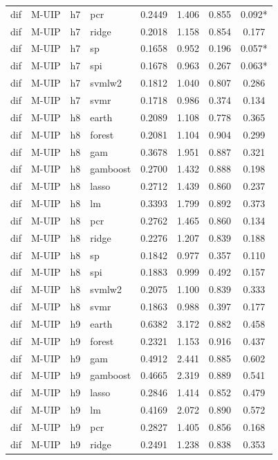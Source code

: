 \begin{ThreePartTable}
\begin{longtable}[t]{llclcccc}
dif & M-UIP & h7 & pcr & 0.2449 & 1.406 & 0.855 & 0.092*\\
dif & M-UIP & h7 & ridge & 0.2018 & 1.158 & 0.854 & 0.177\\
dif & M-UIP & h7 & sp & 0.1658 & 0.952 & 0.196 & 0.057*\\
dif & M-UIP & h7 & spi & 0.1678 & 0.963 & 0.267 & 0.063*\\
dif & M-UIP & h7 & svmlw2 & 0.1812 & 1.040 & 0.807 & 0.286\\
dif & M-UIP & h7 & svmr & 0.1718 & 0.986 & 0.374 & 0.134\\
\addlinespace
dif & M-UIP & h8 & earth & 0.2089 & 1.108 & 0.778 & 0.365\\
dif & M-UIP & h8 & forest & 0.2081 & 1.104 & 0.904 & 0.299\\
dif & M-UIP & h8 & gam & 0.3678 & 1.951 & 0.887 & 0.321\\
dif & M-UIP & h8 & gamboost & 0.2700 & 1.432 & 0.888 & 0.198\\
dif & M-UIP & h8 & lasso & 0.2712 & 1.439 & 0.860 & 0.237\\
dif & M-UIP & h8 & lm & 0.3393 & 1.799 & 0.892 & 0.373\\
dif & M-UIP & h8 & pcr & 0.2762 & 1.465 & 0.860 & 0.134\\
dif & M-UIP & h8 & ridge & 0.2276 & 1.207 & 0.839 & 0.188\\
dif & M-UIP & h8 & sp & 0.1842 & 0.977 & 0.357 & 0.110\\
dif & M-UIP & h8 & spi & 0.1883 & 0.999 & 0.492 & 0.157\\
dif & M-UIP & h8 & svmlw2 & 0.2075 & 1.100 & 0.839 & 0.333\\
dif & M-UIP & h8 & svmr & 0.1863 & 0.988 & 0.397 & 0.177\\
\addlinespace
dif & M-UIP & h9 & earth & 0.6382 & 3.172 & 0.882 & 0.458\\
dif & M-UIP & h9 & forest & 0.2321 & 1.153 & 0.916 & 0.437\\
dif & M-UIP & h9 & gam & 0.4912 & 2.441 & 0.885 & 0.602\\
dif & M-UIP & h9 & gamboost & 0.4665 & 2.319 & 0.889 & 0.541\\
dif & M-UIP & h9 & lasso & 0.2846 & 1.414 & 0.852 & 0.479\\
dif & M-UIP & h9 & lm & 0.4169 & 2.072 & 0.890 & 0.572\\
dif & M-UIP & h9 & pcr & 0.2827 & 1.405 & 0.856 & 0.168\\
dif & M-UIP & h9 & ridge & 0.2491 & 1.238 & 0.838 & 0.353\\

\end{longtable}
\end{ThreePartTable}
